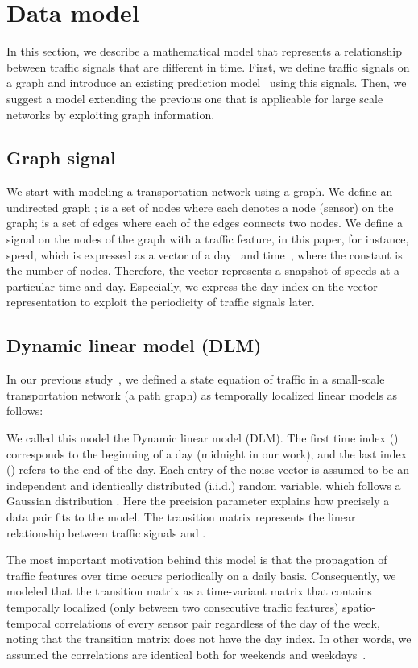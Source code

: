 \documentclass[journal]{IEEEtran}
\begin{document}
\section{Data model}
In this section, we describe a mathematical model that represents a relationship between traffic signals that are different in time. 
First, we define traffic signals on a graph and introduce an existing prediction model~\cite{kwak2020travel} using this signals. 
Then, we suggest a model extending the previous one that is applicable for large scale networks by exploiting graph information.
\subsection{Graph signal}
We start with modeling a transportation network using a graph. 
We define an undirected graph ;  is a set of nodes where each  denotes a node (sensor) on the graph;  is a set of edges where each of the edges connects two nodes. 
We define a signal on the nodes of the graph with a traffic feature, in this paper, for instance, speed, which is expressed as a vector  of a day~ and time~, where the constant  is the number of nodes. 
Therefore, the vector  represents a snapshot of speeds at a particular time and day. 
Especially, we express the day index on the vector representation to exploit the periodicity of traffic signals later.


\subsection{Dynamic linear model (DLM)}
In our previous study~\cite{kwak2020travel}, we defined a state equation of traffic in a small-scale transportation network (a path graph) as temporally localized linear models as follows:

We called this model the Dynamic linear model (DLM).
The first time index () corresponds to the beginning of a day (midnight in our work), and the last index () refers to the end of the day.
Each entry of the noise vector  is assumed to be an independent and identically distributed (i.i.d.) random variable, which follows a Gaussian distribution . Here the precision parameter  explains how precisely a data pair  fits to the model. 
The transition matrix  represents the linear relationship between traffic signals  and .



The most important motivation behind this model is that the propagation of traffic features over time occurs periodically on a daily basis.
Consequently, we modeled that the transition matrix  as a time-variant matrix that contains temporally localized (only between two consecutive traffic features) spatio-temporal correlations of every sensor pair regardless of the day of the week, noting that the transition matrix does not have the day index. In other words, we assumed the correlations are identical both for weekends and weekdays~\cite{kwak2020travel}.
\end{document}
